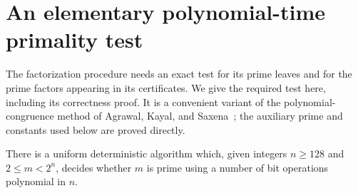 \section{An elementary polynomial-time primality test}
\label{app:primality}

The factorization procedure needs an exact test for its prime leaves and
for the prime factors appearing in its certificates.  We give the required
test here, including its correctness proof. It is a convenient variant of
the polynomial-congruence method of Agrawal, Kayal, and
Saxena~\cite[Section~4]{AKS};
the auxiliary prime and constants used below are proved directly.

\begin{lemma}\label{lem:primality}
There is a uniform deterministic algorithm which, given integers
$n\ge128$ and $2\le m<2^n$, decides whether $m$ is prime using a number of
bit operations polynomial in $n$.
\end{lemma}


